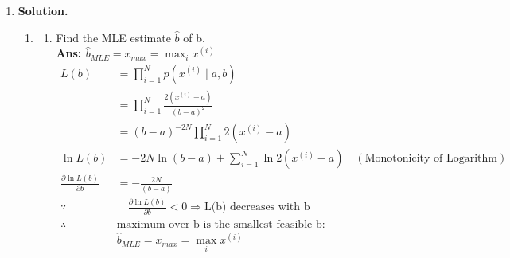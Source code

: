 \documentclass{article}
\theoremstyle{definition}
\theoremstyle{remark}
\newenvironment{Q}
        {%
          \clearpage
          \item
        }
        {%
          \phantom{s} 
          \bigskip
        }
\begin{document}
\begin{enumerate}[font={\Large\bfseries},left=0pt]
\begin{Q}
\begin{enumerate}
\end{enumerate}


\end{Q}



\textbf{Solution.}
\begin{tcolorbox}
    \begin{enumerate}
        \item \begin{enumerate}
            \item Find the MLE estimate $\hat{b}$ of b. \\
            \textbf{Ans: $\hat{b}_{MLE} = x_{max} = \max_i x^{(i)}$}
            \begin{align}
                L(b) &= \prod^N_{i=1} p(x^{(i)} \mid a, b) \\
                     &= \prod^N_{i=1} \frac{2(x^{(i)} - a)}{(b - a)^2} \\
                     &= (b - a)^{-2N} \prod^N_{i=1} 2(x^{(i)} - a) \\
                    \ln L(b) &= -2N \ln(b - a) + \sum^N_{i = 1} \ln 2(x^{(i)} - a) \quad (\text{Monotonicity of Logarithm})\\
                 \frac{\partial \ln L(b)}{\partial b}    &= -\frac{2N}{(b - a)} \\
                    \because &\quad \frac{\partial \ln L(b)}{\partial b} < 0 \Rightarrow \text{L(b) decreases with b}\\
                    \therefore & \text{maximum over b is the smallest feasible b:} \\
                    & \hat{b}_{MLE} = x_{max} = \max_i x^{(i)}
            \end{align}
        

\end{enumerate}
\end{enumerate}
\end{tcolorbox}
\end{enumerate}
\end{document}

